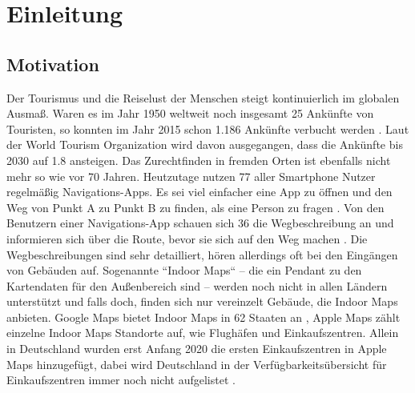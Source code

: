 \chapter{Einleitung}

\section{Motivation}
Der Tourismus und die Reiselust der Menschen steigt kontinuierlich im globalen Ausmaß.
Waren es im Jahr 1950 weltweit noch insgesamt \SI{25}{\mio} Ankünfte von Touristen, so konnten im Jahr 2015 schon \SI{1.186}{\mrd} Ankünfte verbucht werden \parencite{GLA2017}.
Laut der World Tourism Organization wird davon ausgegangen, dass die Ankünfte bis 2030 auf \SI{1.8}{\mrd} ansteigen.
Das Zurechtfinden in fremden Orten ist ebenfalls nicht mehr so wie vor 70 Jahren.
Heutzutage nutzen \SI{77}{\prc} aller Smartphone Nutzer regelmäßig Navigations-Apps.
Es sei viel einfacher eine App zu öffnen und den Weg von Punkt A zu Punkt B zu finden, als eine Person zu fragen \parencite{PAN2018}.
Von den Benutzern einer Navigations-App schauen sich \SI{36}{\prc} die Wegbeschreibung an und informieren sich über die Route, bevor sie sich auf den Weg machen \parencite{PAN2018}.
Die Wegbeschreibungen sind sehr detailliert, hören allerdings oft bei den Eingängen von Gebäuden auf.
Sogenannte ``Indoor Maps`` – die ein Pendant zu den Kartendaten für den Außenbereich sind – werden noch nicht in allen Ländern unterstützt und falls doch, finden sich nur vereinzelt Gebäude, die Indoor Maps anbieten.
Google Maps bietet Indoor Maps in 62 Staaten an \parencite{GOO2020}, Apple Maps zählt einzelne Indoor Maps Standorte auf, wie Flughäfen und Einkaufszentren.
Allein in Deutschland wurden erst Anfang 2020 die ersten Einkaufszentren in Apple Maps hinzugefügt, dabei wird Deutschland in der Verfügbarkeitsübersicht für Einkaufszentren immer noch nicht aufgelistet \parencite{OES2020}.

